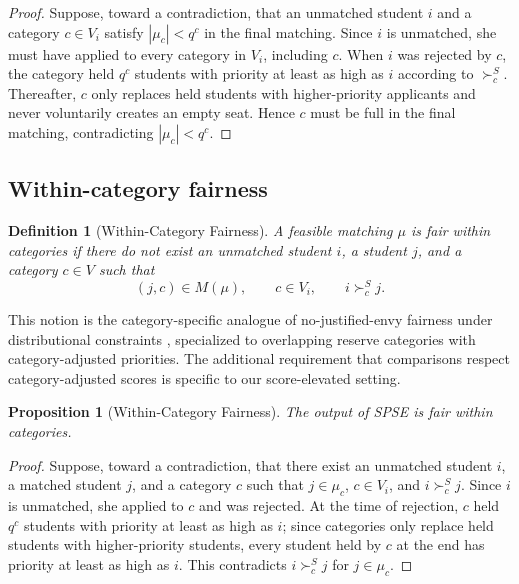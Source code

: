 \documentclass[10pt]{article}
\newtheorem{definition}{Definition}
\newtheorem{proposition}{Proposition}
\newcommand{\1}{\mathbf{1}}
\begin{document}
\begin{proof}
Suppose, toward a contradiction, that an unmatched student $i$ and a category $c\in V_i$ satisfy $|\mu_c|<q^c$ in the final matching. Since $i$ is unmatched, she must have applied to every category in $V_i$, including $c$. When $i$ was rejected by $c$, the category held $q^c$ students with priority at least as high as $i$ according to $\succ_c^S$. Thereafter, $c$ only replaces held students with higher-priority applicants and never voluntarily creates an empty seat. Hence $c$ must be full in the final matching, contradicting $|\mu_c|<q^c$.
\end{proof}

\subsection{Within-category fairness}

\begin{definition}[Within-Category Fairness]
A feasible matching $\mu$ is fair within categories if there do not exist an unmatched student $i$, a student $j$, and a category $c\in V$ such that
\[
(j,c)\in M(\mu),\qquad c\in V_i,\qquad i\succ_c^S j.
\]
\end{definition}

This notion is the category-specific analogue of no-justified-envy fairness under distributional constraints \citep{GKK+17a,KHIY17a}, specialized to overlapping reserve categories with category-adjusted priorities. The additional requirement that comparisons respect category-adjusted scores is specific to our score-elevated setting.

\begin{proposition}[Within-Category Fairness]
\label{prop:within-category-fairness}
The output of SPSE is fair within categories.
\end{proposition}

\begin{proof}
Suppose, toward a contradiction, that there exist an unmatched student $i$, a matched student $j$, and a category $c$ such that $j\in\mu_c$, $c\in V_i$, and $i\succ_c^S j$. Since $i$ is unmatched, she applied to $c$ and was rejected. At the time of rejection, $c$ held $q^c$ students with priority at least as high as $i$; since categories only replace held students with higher-priority students, every student held by $c$ at the end has priority at least as high as $i$. This contradicts $i\succ_c^S j$ for $j\in\mu_c$.
\end{proof}
\end{document}
